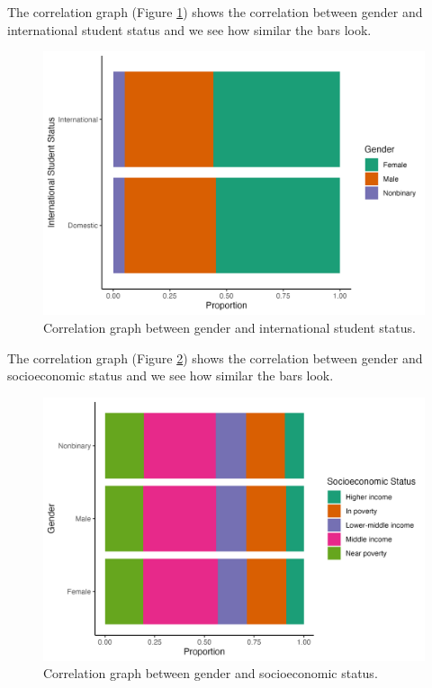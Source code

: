 \documentclass{article}
\begin{document}
The correlation graph (Figure \ref{fig:demg3}) shows the correlation between gender and international student status and we see how similar the bars look.



\begin{figure}

{\centering \includegraphics[width=0.9\linewidth]{gender_v_international_student_status} 

}

\caption{Correlation graph between gender and international student status.}\label{fig:demg3}
\end{figure}

The correlation graph (Figure \ref{fig:demg4}) shows the correlation between gender and socioeconomic status and we see how similar the bars look.



\begin{figure}

{\centering \includegraphics[width=0.9\linewidth]{gender_v_socioeconomic_status} 

}

\caption{Correlation graph between gender and socioeconomic status.}\label{fig:demg4}
\end{figure}
\end{document}

